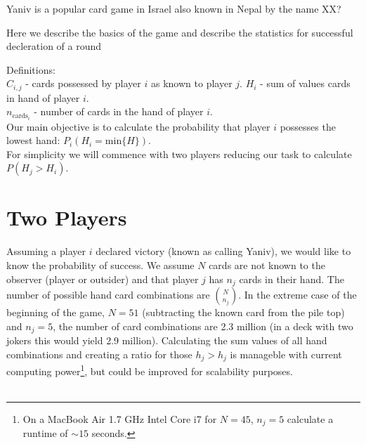 \documentclass[10pt]{article}
\begin{document}
Yaniv is a popular card game in Israel also known in Nepal by the name XX?

Here we describe the basics of the game and describe the statistics for successful decleration of a round

Definitions:   \\
$C_{i,j}$ - cards possessed by player $i$ as known to player $j$.  
$H_i$ - sum of values cards in hand of player $i$.    \\
$n_{\mathrm{cards}_i}$ - number of cards in the hand of player $i$.  \\


Our main objective is to calculate the probability that player $i$ possesses the lowest hand: $P_{i}(H_i = \mathrm{min}\{H\}) $.  \\

For simplicity we will commence with two players reducing our task to calculate  $P(H_j>H_i)$.  

\section{Two Players}

Assuming a player $i$ declared victory (known as calling Yaniv), we would like to know the probability of success. 
We assume $N$ cards are not known to the observer (player or outsider) and that player $j$ has $n_j$ cards in their hand. The number of possible hand card combinations are 
$\binom{N}{n_j}$. In the extreme case of the beginning of the game, $N=51$ (subtracting the known card from the pile top) and $n_j=5$, the number 
of card combinations are 2.3 million (in a deck with two jokers this would yield 2.9 million). Calculating the sum values of all hand combinations and creating a ratio for those $h_j>h_j$ is manageble with current computing power\footnote{On a MacBook Air 1.7 GHz Intel Core i7  for $N=45$, $n_j=5$ calculate a runtime of $\sim15$ seconds.}, but could be improved for scalability purposes.
\\ \\
\end{document}
